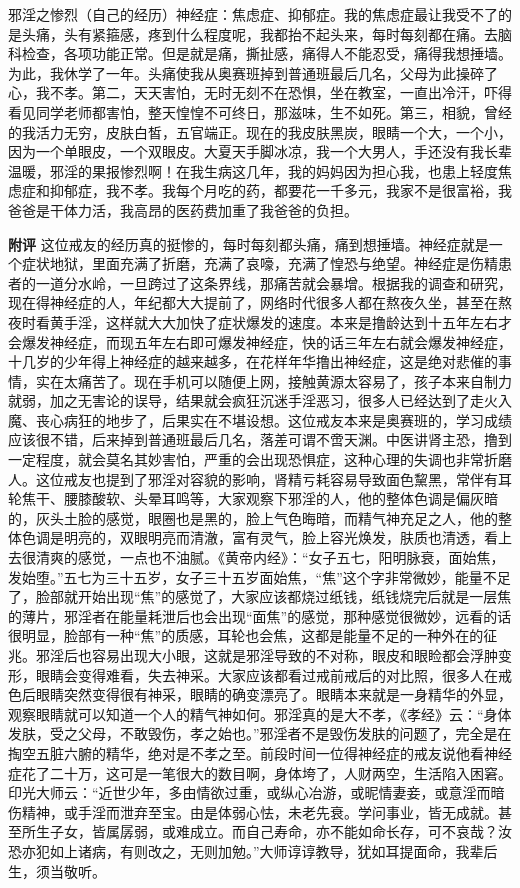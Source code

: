 \begin{case}
    邪淫之惨烈（自己的经历）神经症：焦虑症、抑郁症。我的焦虑症最让我受不了的是头痛，头有紧箍感，疼到什么程度呢，我都抬不起头来，每时每刻都在痛。去脑科检查，各项功能正常。但是就是痛，撕扯感，痛得人不能忍受，痛得我想捶墙。为此，我休学了一年。头痛使我从奥赛班掉到普通班最后几名，父母为此操碎了心，我不孝。第二，天天害怕，无时无刻不在恐惧，坐在教室，一直出冷汗，吓得看见同学老师都害怕，整天惶惶不可终日，那滋味，生不如死。第三，相貌，曾经的我活力无穷，皮肤白皙，五官端正。现在的我皮肤黑炭，眼睛一个大，一个小，因为一个单眼皮，一个双眼皮。大夏天手脚冰凉，我一个大男人，手还没有我长辈温暖，邪淫的果报惨烈啊！在我生病这几年，我的妈妈因为担心我，也患上轻度焦虑症和抑郁症，我不孝。我每个月吃的药，都要花一千多元，我家不是很富裕，我爸爸是干体力活，我高昂的医药费加重了我爸爸的负担。

    \textbf{附评} 这位戒友的经历真的挺惨的，每时每刻都头痛，痛到想捶墙。神经症就是一个症状地狱，里面充满了折磨，充满了哀嚎，充满了惶恐与绝望。神经症是伤精患者的一道分水岭，一旦跨过了这条界线，那痛苦就会暴增。根据我的调查和研究，现在得神经症的人，年纪都大大提前了，网络时代很多人都在熬夜久坐，甚至在熬夜时看黄手淫，这样就大大加快了症状爆发的速度。本来是撸龄达到十五年左右才会爆发神经症，而现五年左右即可爆发神经症，快的话三年左右就会爆发神经症，十几岁的少年得上神经症的越来越多，在花样年华撸出神经症，这是绝对悲催的事情，实在太痛苦了。现在手机可以随便上网，接触黄源太容易了，孩子本来自制力就弱，加之无害论的误导，结果就会疯狂沉迷手淫恶习，很多人已经达到了走火入魔、丧心病狂的地步了，后果实在不堪设想。这位戒友本来是奥赛班的，学习成绩应该很不错，后来掉到普通班最后几名，落差可谓不啻天渊。中医讲肾主恐，撸到一定程度，就会莫名其妙害怕，严重的会出现恐惧症，这种心理的失调也非常折磨人。这位戒友也提到了邪淫对容貌的影响，肾精亏耗容易导致面色黧黑，常伴有耳轮焦干、腰膝酸软、头晕耳鸣等，大家观察下邪淫的人，他的整体色调是偏灰暗的，灰头土脸的感觉，眼圈也是黑的，脸上气色晦暗，而精气神充足之人，他的整体色调是明亮的，双眼明亮而清澈，富有灵气，脸上容光焕发，肤质也清透，看上去很清爽的感觉，一点也不油腻。《黄帝内经》：“女子五七，阳明脉衰，面始焦，发始堕。”五七为三十五岁，女子三十五岁面始焦，“焦”这个字非常微妙，能量不足了，脸部就开始出现“焦”的感觉了，大家应该都烧过纸钱，纸钱烧完后就是一层焦的薄片，邪淫者在能量耗泄后也会出现“面焦”的感觉，那种感觉很微妙，远看的话很明显，脸部有一种“焦”的质感，耳轮也会焦，这都是能量不足的一种外在的征兆。邪淫后也容易出现大小眼，这就是邪淫导致的不对称，眼皮和眼睑都会浮肿变形，眼睛会变得难看，失去神采。大家应该都看过戒前戒后的对比照，很多人在戒色后眼睛突然变得很有神采，眼睛的确变漂亮了。眼睛本来就是一身精华的外显，观察眼睛就可以知道一个人的精气神如何。邪淫真的是大不孝，《孝经》云：“身体发肤，受之父母，不敢毁伤，孝之始也。”邪淫者不是毁伤发肤的问题了，完全是在掏空五脏六腑的精华，绝对是不孝之至。前段时间一位得神经症的戒友说他看神经症花了二十万，这可是一笔很大的数目啊，身体垮了，人财两空，生活陷入困窘。印光大师云：“近世少年，多由情欲过重，或纵心冶游，或昵情妻妾，或意淫而暗伤精神，或手淫而泄弃至宝。由是体弱心怯，未老先衰。学问事业，皆无成就。甚至所生子女，皆属孱弱，或难成立。而自己寿命，亦不能如命长存，可不哀哉？汝恐亦犯如上诸病，有则改之，无则加勉。”大师谆谆教导，犹如耳提面命，我辈后生，须当敬听。
\end{case}

